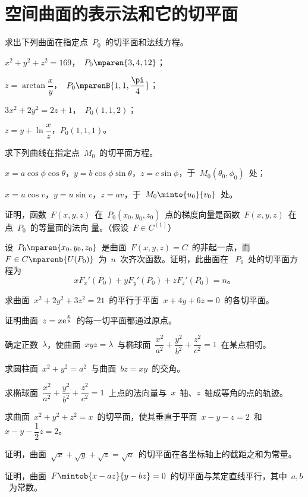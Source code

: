 \section{空间曲面的表示法和它的切平面}
\begin{exercise}
\item 求出下列曲面在指定点~$P_0$~的切平面和法线方程。
\begin{exlistcols}
  \item $x^2+y^2+z^2=169$，~$P_0\mparen{3,4,12}$；
  \item $z=\arctan\dfrac xy$，~$P_0\mparenB{1,1,\dfrac\pi4}$；
  \item $3x^2+2y^2=2z+1$，~$P_0(1,1,2)$；
  \item $z=y+\ln\dfrac xz$，$P_0(1,1,1)$。
\end{exlistcols}
\item 求下列曲线在指定点~$M_0$~的切平面方程。
\begin{exlist}
  \item $x=a\cos\phi\cos\theta$，$y=b\cos\phi\sin\theta$，$z=c\sin\phi$，于~$M_0(\theta_0,\phi_0)$~处；
  \item $x=u\cos v$，$y=u\sin v$，$z=av$，于~$M_0\minto{u_0}{v_0}$~处。
\end{exlist}
\item 证明，函数~$F(x,y,z)$~在~$P_0(x_0,y_0,z_0)$~点的梯度向量是函数~$F(x,y,z)$~在点~$P_0$~的等量面的法向
量。（假设~$F\in C^{(1)}$）
\item 设~$P_0\mparen{x_0,y_0,z_0}$~是曲面~$F(x,y,z)=C$~的非起一点，而~$F\in C\mparenb{U(P_0)}$~为~$n$~次齐次函数。证明，此曲面在
~$P_0$~处的切平面方程为
\[
  xF_x'(P_0)+yF_y'(P_0)+zF_z'(P_0)=n 。
\]
\item 求曲面~$x^2+2y^2+3z^2=21$~的平行于平面~$x+4y+6z=0$~的各切平面。
\item 证明曲面~$z=x\mathrm e^{\frac xy}$~的每一切平面都通过原点。
\item 确定正数~$\lambda$，使曲面~$xyz=\lambda$~与椭球面~$\dfrac{x^2}{a^2}+\dfrac{y^2}{b^2}+\dfrac{z^2}{c^2}=1$~在某点相切。
\item 求圆柱面~$x^2+y^2=a^2$~与曲面~$bz=xy$~的交角。
\item 求椭球面~$\dfrac{x^2}{a^2}+\dfrac{y^2}{b^2}+\dfrac{z^2}{c^2}=1$~上点的法向量与~$x$~轴、$z$~轴成等角的点的轨迹。
\item 求曲面~$x^2+y^2+z^2=x$~的切平面，使其垂直于平面~$x-y-z=2$~和~$x-y-\dfrac12z=2$。
\item 证明，曲面~$\sqrt x+\sqrt y+\sqrt z=\sqrt a$~的切平面在各坐标轴上的截距之和为常量。
\item 证明，曲面~$F\mintob{x-az}{y-bz}=0$~的切平面与某定直线平行，其中~$a,b$~为常数。

\end{exercise}

